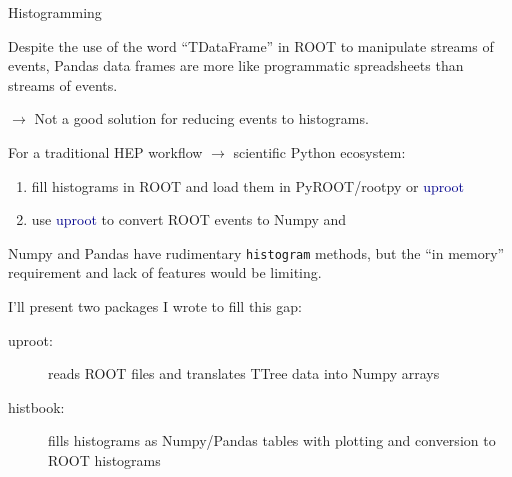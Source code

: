 \documentclass[aspectratio=169]{beamer}
\begin{document}
\begin{frame}{Histogramming}
\vspace{0.5 cm}

Despite the use of the word ``TDataFrame'' in ROOT to manipulate streams of events, Pandas data frames are more like programmatic spreadsheets than streams of events.

\vspace{0.25 cm}
\mbox{\hspace{0.5 cm}}$\longrightarrow$ Not a good solution for reducing events to histograms.

\vspace{0.25 cm}
For a traditional HEP workflow $\to$ scientific Python ecosystem:
\begin{enumerate}
\item fill histograms in ROOT and load them in PyROOT/rootpy or \textcolor{darkblue}{uproot}
\item use \textcolor{darkblue}{uproot} to convert ROOT events to Numpy and 

\end{enumerate}





Numpy and Pandas have rudimentary {\tt\small histogram} methods, but the ``in memory'' requirement and lack of features would be limiting.

\vspace{0.25 cm}
I'll present two packages I wrote to fill this gap:
\begin{description}
\item[uproot:] reads ROOT files and translates TTree data into Numpy arrays
\item[histbook:] fills histograms as Numpy/Pandas tables with plotting and conversion to ROOT histograms
\end{description}
\end{frame}
\end{document}
